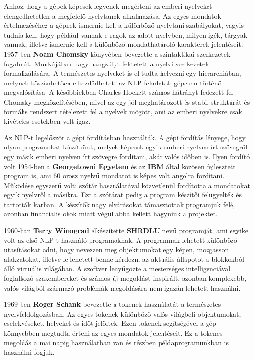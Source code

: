 Ahhoz, hogy a gépek képesek legyenek megérteni az emberi nyelveket elengedhetetlen a megfelelő nyelvtanok alkalmazása. Az egyes mondatok értelmezéséhez a gépnek ismernie kell a különböző nyelvtani szabályokat, vagyis tudnia kell, hogy például vannak-e ragok az adott nyelvben, milyen igék, tárgyak vannak, illetve ismernie kell a különböző mondathatároló karakterek jelentéseit. 1957-ben \textbf{Noam Chomsky} könyvében bevezette a szintaktikai szerkezetek fogalmát. Munkájában nagy hangsúlyt fektetett a nyelvi szerkezetek formalizálására. A természetes nyelveket is el tudta helyezni egy hierarchiában, melynek köszönhetően elkezdődhetett az NLP feladatok gépeken történő megvalósítása. A későbbiekben Charles Hockett számos hátrányt fedezett fel Chomsky megközelítésében, mivel az egy jól meghatározott és stabil struktúrát és formális rendszert tételezett fel a nyelvek mögött, ami az emberi nyelvekre csak kivételes esetekben volt igaz.

Az NLP-t legelőször a gépi fordításban használták. A gépi fordítás lényege, hogy olyan programokat készítsünk, melyek képesek egyik emberi nyelven írt szövegről egy másik emberi nyelven írt szövegre fordítani, akár valós időben is. Ilyen fordító volt 1954-ben a \textbf{Georgetowni Egyetem} és az \textbf{IBM} által közösen fejlesztett program is, ami 60 orosz nyelvű mondatot is képes volt angolra fordítani. Működése egyszerű volt: szótár használatával közvetlenül fordította a mondatokat egyik nyelvről a másikra. Ezt a szótárat pedig a program készítői felügyelték és tartották karban. A készítők nagy elvárásokat támasztottak programjuk felé, azonban financiális okok miatt végül abba kellett hagyniuk a projektet.

1960-ban \textbf{Terry Winograd} elkészítette \textbf{SHRDLU} nevű programját, ami egyike volt az első NLP-t használó programoknak. A programnak lehetett különböző utasításokat adni, hogy nevezzen meg objektumokat egy képen, mozgasson alakzatokat, illetve le lehetett benne kérdezni az aktuális állapotot a blokkokból álló virtuális világában. A szoftver lenyűgözte a mesterséges intelligenciával foglalkozó szakembereket és számos új megoldást inspirált, azonban komplexebb, valós világból származó problémák megoldására nem igazán lehetett használni.

1969-ben \textbf{Roger Schank} bevezette a tokenek használatát a természetes nyelvfeldolgozásban. Az egyes tokenek különböző valós világbeli objektumokat, cselekvéseket, helyeket és időt jelöltek. Ezen tokenek segítségével a gép könnyebben megtudta érteni az egyes mondatok jelentéseit. Ez a tokenes megoldás a mai napig használatban van és részben példaprogramunkban is használni fogjuk.

